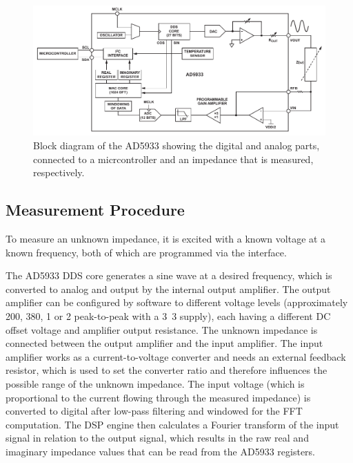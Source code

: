 \begin{figure}[htpb]
  \centering
    \includegraphics[width=\textwidth]{bilder/ad_block.pdf}
  \caption{Block diagram of the AD5933 showing the digital and analog parts, connected to a micrcontroller
    and an impedance that is measured, respectively.}
  \label{fig:ad_block}
\end{figure}


\subsection{Measurement Procedure} \label{sec:ad5933_proc}

To measure an unknown impedance, it is excited with a known voltage at a known frequency, both of which are programmed
via the \iic{} interface.

The AD5933 DDS core generates a sine wave at a desired frequency, which is converted to analog and output by the
internal output amplifier. The output amplifier can be configured by software to different voltage levels
(approximately \unit{200}{\milli\volt}, \unit{380}{\milli\volt}, \unit{1}{\volt} or \unit{2}{\volt} peak-to-peak with
a \unit{3.3}{\volt} supply), each having a different DC offset voltage and amplifier output resistance.
The unknown impedance is connected between the output amplifier and the input amplifier. The input amplifier works as
a current-to-voltage converter and needs an external feedback resistor, which is used to set the converter ratio
and therefore influences the possible range of the unknown impedance.
The input voltage (which is proportional to the current flowing through the measured impedance) is converted to digital
after low-pass filtering and windowed for the FFT computation.
The DSP engine then calculates a Fourier transform of the input signal in relation to the output signal,
which results in the raw real and imaginary impedance values that can be read from the AD5933 registers.

